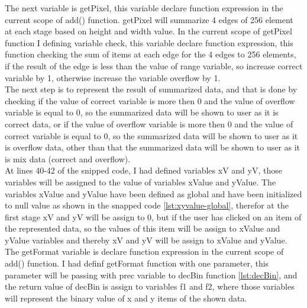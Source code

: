 \documentclass[11pt]{article}
\begin{document}
The next variable is getPixel, this variable declare function expression in the current scope of add() function. getPixel will summarize 4 edges of 256 element at each stage based on height and width value. In the current scope of getPixel function I defining variable check, this variable declare function expression, this function checking the sum of items at each edge for the 4 edges to 256 elements, if the result of the edge is less than the value of range variable, so increase correct variable by 1,  otherwise increase the variable overflow by 1.\\

The next step is to represent the result of summarized data, and that is done by checking if the value of correct variable is more then 0 and the value of overflow variable is equal to 0, so the summarized data will be shown to user as it is correct data, or if the value of overflow variable is more then 0 and the value of correct variable is equal to 0, so the summarized data will be shown to user as it is overflow data, other than that the summarized data will be shown to user as it is mix data (correct and overflow).\\

At lines 40-42 of the snipped code, I had defined variables xV and yV, those variables will be assigned to the value of variables xValue and yValue. The variables xValue and yValue have been defined as global and have been initialized to null value as shown in the snapped code \ref{lst:xyvalue-global}, therefor at the first stage xV and yV will be assign to 0,  but if the user has clicked on an item of the represented data, so the values of this item will be assign to xValue and yValue variables and thereby xV and yV will be assign to xValue and yValue.\\

The getFormat variable is declare function expression in the current scope of add() function. I had definf getFormat function with one parameter, this parameter will be passing with prec variable to decBin function \ref{lst:decBin}, and the return value of decBin is assign to variables f1 and f2, where those variables will represent the binary value of x and y items of the shown data.\\
\end{document}
